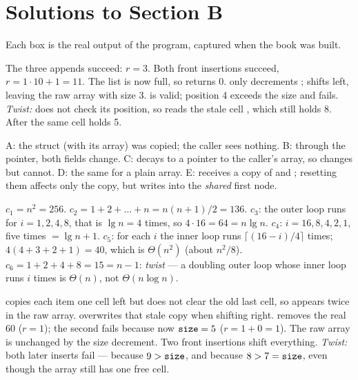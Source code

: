 \chapter{Solutions to Section B}\label{ch:soltracing}

Each box is the real output of the program, captured when the book was built.

The three appends succeed: $r=3$. Both front insertions succeed, $r=1\cdot10+1=11$. The
list is now full, so  returns 0.  only decrements
;  shifts left, leaving the raw array \cc{[16 4 8 8 15]} with
size 3.  is valid; position 4 exceeds the size and fails.
\emph{Twist:}  does not check its position, so  reads the
stale cell , which still holds 8. After  the same cell
holds 5.

A: the struct (with its array) was copied; the caller sees nothing. B: through the
pointer, both fields change. C:  decays to a pointer to the caller's array,
so  changes but  cannot. D: the same for a plain array.
E:  receives a copy of  and ; resetting them affects only
the copy, but  writes into the \emph{shared} first node.

$c_1=n^2=256$. $c_2=1+2+\dots+n=n(n+1)/2=136$. $c_3$: the outer loop runs for
$i=1,2,4,8$, that is $\lg n=4$ times, so $4\cdot16=64=n\lg n$. $c_4$: $i=16,8,4,2,1$, five
times $=\lg n+1$. $c_5$: for each $i$ the inner loop runs $\lceil(16-i)/4\rceil$ times;
$4(4+3+2+1)=40$, which is $\Theta(n^2)$ (about $n^2/8$). $c_6=1+2+4+8=15=n-1$:
\emph{twist} --- a doubling outer loop whose inner loop runs $i$ times is $\Theta(n)$,
not $\Theta(n\log n)$.

 copies each item one cell left but does not clear the old last cell, so
 appears twice in the raw array.  overwrites that stale copy
when shifting right.  removes the real 60 ($r=1$); the second
 fails because now $\texttt{size}=5$ ($r=1+0=1$). The raw array is unchanged by
the size decrement. Two front insertions shift everything. \emph{Twist:} both later
inserts fail ---  because $9>\texttt{size}$, and  because
$8>7=\texttt{size}$, even though the array still has one free cell.

